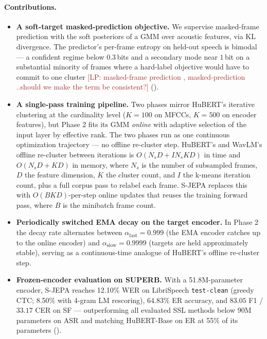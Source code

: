 \documentclass[9pt,twocolumn]{article}
\theoremstyle{plain}
\theoremstyle{definition}
\theoremstyle{remark}
\newcommand{\lp}[1]{\textcolor{brown}{[LP: #1]}}
\begin{document}
\paragraph{Contributions.}
\begin{itemize}
    \item \textbf{A soft-target masked-prediction objective.} We supervise masked-frame prediction with the soft posteriors of a GMM over acoustic features, via KL divergence. The predictor's per-frame entropy on held-out speech is bimodal --- a confident regime below $0.3$\,bits and a secondary mode near $1$\,bit on a substantial minority of frames where a hard-label objective would have to commit to one cluster \lp{ masked-frame prediction , masked-prediction ..should we make the term be consistent?} ().
    \item \textbf{A single-pass training pipeline.} Two phases mirror HuBERT's iterative clustering at the cardinality level ($K\!=\!100$ on MFCCs, $K\!=\!500$ on encoder features), but Phase 2 fits its GMM \emph{online} with adaptive selection of the input layer by effective rank. The two phases run as one continuous optimization trajectory --- no offline re-cluster step. HuBERT's and WavLM's offline re-cluster between iterations is $O(N_s D + I N_s K D)$ in time and $O(N_s D + K D)$ in memory, where $N_s$ is the number of subsampled frames, $D$ the feature dimension, $K$ the cluster count, and $I$ the k-means iteration count, plus a full corpus pass to relabel each frame. S-JEPA replaces this with $O(B K D)$-per-step online updates that reuses the training forward pass, where $B$ is the minibatch frame count.
    \item \textbf{Periodically switched EMA decay on the target encoder.} In Phase 2 the decay rate alternates between $\alpha_{\text{fast}}\!=\!0.999$ (the EMA encoder catches up to the online encoder) and $\alpha_{\text{slow}}\!=\!0.9999$ (targets are held approximately stable), serving as a continuous-time analogue of HuBERT's offline re-cluster step.
    \item \textbf{Frozen-encoder evaluation on SUPERB.} With a 51.8M-parameter encoder, S-JEPA reaches 12.10\% WER on LibriSpeech \texttt{test-clean} (greedy CTC; 8.50\% with 4-gram LM rescoring), $64.83\%$ ER accuracy, and $83.05$ F1 / $33.17$ CER on SF --- outperforming all evaluated SSL methods below 90M parameters on ASR and matching HuBERT-Base on ER at 55\% of its parameters ().
\end{itemize}
\fi
\end{document}
